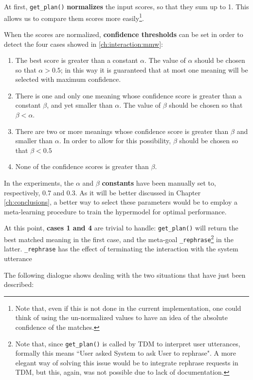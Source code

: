 At first, \texttt{get\_plan()} \textbf{normalizes} the input scores, so that they sum up to 1. This allows us to compare them scores more easily\footnote{Note that, even if this is not done in the current implementation, one could think of using the un-normalized values to have an idea of the absolute confidence of the matches.}.

When the scores are normalized, \textbf{confidence thresholds} can be set in order to detect the four cases showed in \ref{ch:interaction:mmw}:
\begin{enumerate}
	\item The best score is greater than a constant $\alpha$. The value of $\alpha$ should be chosen so that $\alpha > 0.5$; in this way it is guaranteed that at most one meaning will be selected with maximum confidence.
	\item There is one and only one meaning whose confidence score is greater than a constant $\beta$, and yet smaller than $\alpha$. The value of $\beta$ should be chosen so that $\beta < \alpha$.
	\item There are two or more meanings whose confidence score is greater than $\beta$ and smaller than $\alpha$. In order to allow for this possibility, $\beta$ should be chosen so that $\beta < 0.5$
	\item None of the confidence scores is greater than $\beta$.
\end{enumerate}

In the experiments, the $\alpha$ and $\beta$ \textbf{constants} have been manually set to, respectively, 0.7 and 0.3. As it will be better discussed in Chapter \ref{ch:conclusions}, a better way to select these parameters would be to employ a meta-learning procedure to train the hypermodel for optimal performance.

At this point, \textbf{cases 1 and 4} are trivial to handle: \texttt{get\_plan()} will return the best matched meaning in the first case, and the meta-goal \texttt{\_rephrase}\footnote{Note that, since \texttt{get\_plan()} is called by TDM to interpret user utterances, formally this means ``User asked System to ask User to rephrase". A more elegant way of solving this issue would be to integrate rephrase requests in TDM, but this, again, was not possible due to lack of documentation.} in the latter. \texttt{\_rephrase} has the effect of terminating the interaction with the system utterance

The following dialogue shows \pname dealing with the two situations that have just been described:

